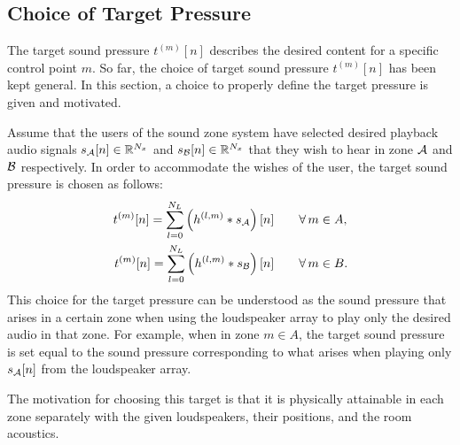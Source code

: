 \subsection{Choice of Target Pressure}
\label{ch:sound_zone:data_model:target_pressure_choice}
The target sound pressure $t^{(m)}[n]$ describes the desired content for a specific control point $m$. 
So far, the choice of target sound pressure $t^{(m)}[n]$ has been kept general. 
In this section, a choice to properly define the target pressure is given and motivated.

Assume that the users of the sound zone system have selected desired playback audio signals $s_{\mathcal{A}}[n]\in\mathbb{R}^{N_x}$ and
$s_{\mathcal{B}}[n]\in\mathbb{R}^{N_x}$ that they wish to hear in zone $\mathcal{A}$ and $\mathcal{B}$ respectively.
In order to accommodate the wishes of the user, the target sound pressure is chosen as follows: 
\begin{align}
    \begin{aligned}
        t^{(m)}[n] = \sum_{l=0}^{N_L} \left(h^{(l,m)} \ast s_{\mathcal{A}}\right)[n]\qquad &\forall\,m\in A,\\
        t^{(m)}[n] = \sum_{l=0}^{N_L} \left(h^{(l,m)} \ast s_{\mathcal{B}}\right)[n]\qquad &\forall\,m\in B.
    \end{aligned}
    \label{eq:sound_zone:data_model:target_pressure}
\end{align}
This choice for the target pressure can be understood as the sound pressure that arises in a certain zone
when using the loudspeaker array to play only the desired audio in that zone. 
For example, when in zone $m\in A$, the target sound pressure is set equal to the sound pressure corresponding to 
what arises when playing only $s_{\mathcal{A}}[n]$ from the loudspeaker array.

The motivation for choosing this target is that it is physically attainable in each zone separately
with the given loudspeakers, their positions, and the room acoustics.
